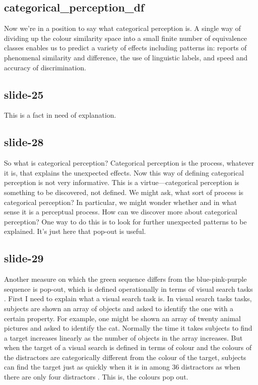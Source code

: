 \documentclass[12pt,\papersize]{extarticle}
\begin{document}
 
\subsection{categorical\_perception\_df}
Now we're in a position to say what categorical perception is.
A single way of dividing up the colour similarity space into a small finite number of equivalence classes enables us to predict a variety of effects including patterns in: reports of phenomenal similarity and difference, the use of linguistic labels, and speed and accuracy of discrimination.
 
 
\subsection{slide-25}
This is a fact in need of explanation.
 
 
\subsection{slide-28}
So what is categorical perception?
Categorical perception is the process, whatever it is, that explains the unexpected effects.
Now this way of defining categorical perception is not very informative.
This is a virtue---categorical perception is something to be discovered, not defined.
We might ask, what sort of process is categorical perception?
In particular, we might wonder whether and in what sense it is a perceptual process.
How can we discover more about categorical perception?
One way to do this is to look for further unexpected patterns to be explained.
It's just here that pop-out is useful.
 
 
\subsection{slide-29}
Another measure on which the green sequence differs from the blue-pink-purple sequence is pop-out, which is defined operationally in terms of visual search tasks \citep[p.\ 117]{Treisman:1986pm}.
First I need to explain what a visual search task is.
In visual search tasks tasks, subjects are shown an array of objects and asked to identify the one with a certain property.
For example, one might be shown an array of twenty animal pictures and asked to identify the cat.
Normally the time it takes subjects to find a target increases linearly as the number of objects in the array increases.
But when the target of a visual search is defined in terms of colour and the colours of the distractors are categorically different from the colour of the target, subjects can find the target just as quickly when it is in among 36 distractors as when there are only four distractors \citep[Experiment 1]{Daoutis:2006qk}.
This is, the colours pop out.
 
\end{document}
